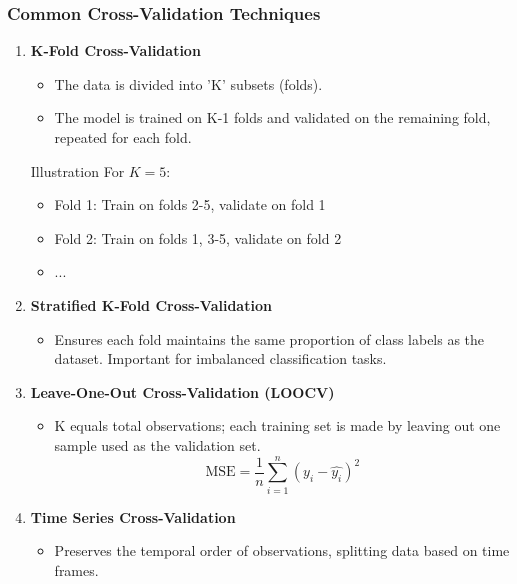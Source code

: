 \documentclass[aspectratio=169]{beamer}
\begin{document}
\begin{frame}[fragile]
    \frametitle{Common Cross-Validation Techniques}
    \begin{enumerate}
        \item \textbf{K-Fold Cross-Validation}
            \begin{itemize}
                \item The data is divided into 'K' subsets (folds).
                \item The model is trained on K-1 folds and validated on the remaining fold, repeated for each fold.
            \end{itemize}
            \begin{block}{Illustration}
                For \( K = 5 \):
                \begin{itemize}
                    \item Fold 1: Train on folds 2-5, validate on fold 1
                    \item Fold 2: Train on folds 1, 3-5, validate on fold 2
                    \item ...
                \end{itemize}
            \end{block}
        
        \item \textbf{Stratified K-Fold Cross-Validation}
            \begin{itemize}
                \item Ensures each fold maintains the same proportion of class labels as the dataset. Important for imbalanced classification tasks.
            \end{itemize}

        \item \textbf{Leave-One-Out Cross-Validation (LOOCV)}
            \begin{itemize}
                \item K equals total observations; each training set is made by leaving out one sample used as the validation set.
                \begin{equation}
                \text{MSE} = \frac{1}{n} \sum_{i=1}^{n} (y_i - \hat{y_i})^2
                \end{equation}
            \end{itemize}

        \item \textbf{Time Series Cross-Validation}
            \begin{itemize}
                \item Preserves the temporal order of observations, splitting data based on time frames.
            \end{itemize}
    \end{enumerate}
\end{frame}
\end{document}
